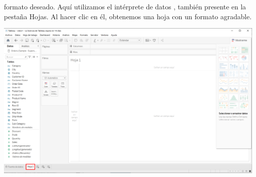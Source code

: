 \documentclass[12pt,letterpaper]{article}
\begin{document}
formato deseado. Aquí utilizamos el intérprete de datos , también presente en la pestaña
Hojas. Al hacer clic en él, obtenemos una hoja con un formato agradable.
\begin{center}
    \includegraphics[width=16cm]{img/5.png}
    \vspace{1cm}  
\end{center}
\end{document}
